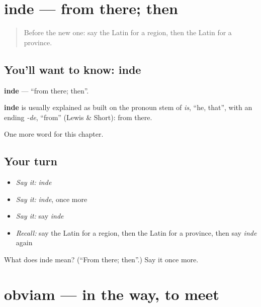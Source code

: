 \section[inde]{inde — from there; then}

\label{lesson:LA-C209-inde}



\begin{quote}
Before the new one: say the Latin for a region, then the Latin for a province.
\end{quote}

\subsection*{You'll want to know: inde}
\textbf{inde} — \textquotedblleft{}from there; then\textquotedblright{}.

\begin{cousinweb}
\textbf{inde} is usually explained as built on the pronoun stem of \emph{is}, \textquotedblleft{}he, that\textquotedblright{}, with an ending \emph{-de}, \textquotedblleft{}from\textquotedblright{} (Lewis \& Short): from there.
\end{cousinweb}

\begin{grammarlens}[title={What you've built}]
One more word for this chapter.
\end{grammarlens}

\subsection*{Your turn}
\begin{itemize}
\raggedright
  \item \emph{Say it:} \emph{inde}
  \item \emph{Say it:} \emph{inde}, once more
  \item \emph{Say it:} say \emph{inde}
  \item \emph{Recall:} say the Latin for a region, then the Latin for a province, then say \emph{inde} again
\end{itemize}

\begin{tcolorbox}[breakable,colback=teal!4,colframe=teal!35!black,title={Before you move on}]
What does inde mean? (\textquotedblleft{}From there; then\textquotedblright{}.) Say it once more.
\end{tcolorbox}
\section[obviam]{obviam — in the way, to meet}

